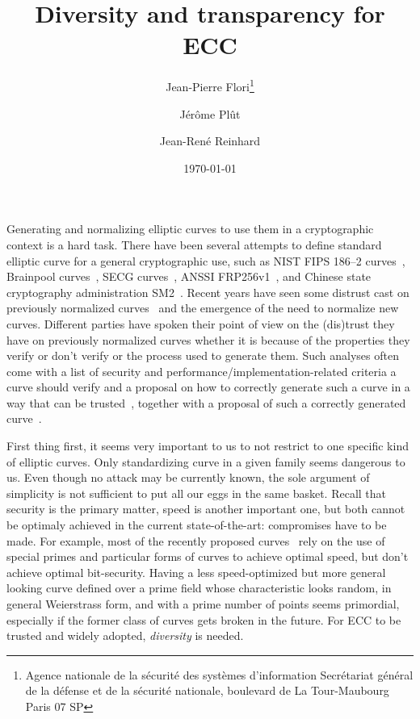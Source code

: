 \documentclass[twocolumn,letterpaper]{article}
\title{Diversity and transparency for ECC}
\author{Jean-Pierre Flori\thanks{Agence nationale de la sécurité des systèmes d'information\newline%
Secrétariat général de la défense et de la sécurité nationale\newline%
51, boulevard de La Tour-Maubourg\newline%
75700 Paris 07 SP}%
\and Jérôme Plût\footnotemark[1] \and Jean-René Reinhard\footnotemark[1]}
\date{\today}
\begin{document}
\sloppy

\maketitle

Generating and normalizing elliptic curves to use them in a cryptographic
context is a hard task.
There have been several attempts to define standard elliptic curve
for a general cryptographic use,
such as NIST FIPS 186--2 curves~\cite{nist2000fips186-2},
Brainpool curves~\cite{rfc5639},
SECG curves~\cite{certicom2010sec2},
ANSSI FRP256v1~\cite{jorf2011ce},
and Chinese state cryptography administration SM2~\cite{oscca2010sm2}.
Recent years have seen some distrust cast on previously normalized
curves~\cite{rfc5639,nist2000fips186-2,jorf2011ce,oscca2010sm2}
and the emergence of the need to normalize new curves.
Different parties have spoken their point of view on the (dis)trust they have
on previously normalized curves whether it is because of
the properties they verify or don't verify
or the process used to generate them.
Such analyses often come with
a list of security and performance/implementation-related criteria
a curve should verify
and a proposal on how to correctly generate such a curve in a way that can be
trusted~\cite{safecurves,msr2014bcln,eprint2014brainpool,eprint2013abgr},
together with a proposal of such a correctly generated
curve~\cite{pkc2006bernstein,msr2014bcln,eprint2013abgr}.

First thing first, it seems very important to us to not restrict
to one specific kind of elliptic curves.
Only standardizing curve in a given family seems dangerous to us.
Even though no attack may be currently known, the sole argument of simplicity
is not sufficient to put all our eggs in the same basket.
Recall that security is the primary matter, speed is another important one,
but both cannot be optimaly achieved in the current state-of-the-art:
compromises have to be made.
For example, most of the recently proposed curves~\cite{pkc2006bernstein,msr2014bcln,eprint2013abgr}
rely on the use of special primes and particular forms of curves to achieve optimal speed,
but don't achieve optimal bit-security.
Having a less speed-optimized but more general looking curve
defined over a prime field whose characteristic looks random,
in general Weierstrass form, and with a prime number of points
seems primordial,
especially if the former class of curves gets broken in the future.
For ECC to be trusted and widely adopted, \emph{diversity} is needed.
\end{document}
